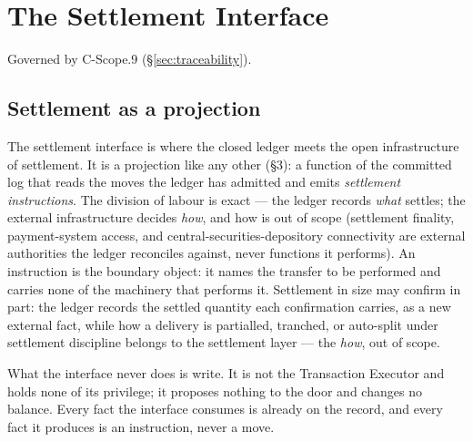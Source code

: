 \documentclass[11pt,a4paper]{article}
\begin{document}

\section{The Settlement Interface}\label{ch:settlement}

Governed by C-Scope.9 (\S\ref{sec:traceability}).

\subsection{Settlement as a projection}

The settlement interface is where the closed ledger meets the open infrastructure
of settlement. It is a projection like any other (\S3): a function of the committed
log that reads the moves the ledger has admitted and emits \emph{settlement
instructions}. The division of labour is exact --- the ledger records \emph{what}
settles; the external infrastructure decides \emph{how}, and how is out of scope
(settlement finality, payment-system access, and central-securities-depository
connectivity are external authorities the ledger reconciles against, never
functions it performs). An instruction is the boundary object: it names the
transfer to be performed and carries none of the machinery that performs it.
Settlement in size may confirm in part: the ledger records the settled quantity each
confirmation carries, as a new external fact, while how a delivery is partialled,
tranched, or auto-split under settlement discipline belongs to the settlement layer ---
the \emph{how}, out of scope.

What the interface never does is write. It is not the Transaction Executor and
holds none of its privilege; it proposes nothing to the door and changes no
balance. Every fact the interface
consumes is already on the record, and every fact it produces is an instruction,
never a move.
\end{document}
